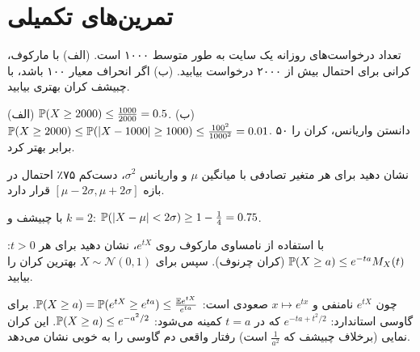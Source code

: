 \section{تمرین‌های تکمیلی}

\begin{exercise}
تعداد درخواست‌های روزانه یک سایت به طور متوسط ۱۰۰۰ است. (الف) با مارکوف، کرانی برای احتمال بیش از ۲۰۰۰ درخواست بیابید. (ب) اگر انحراف معیار ۱۰۰ باشد، با چبیشف کران بهتری بیابید.
\end{exercise}
\begin{solution}
(الف) $\mathbb{P}(X\ge2000)\le\frac{1000}{2000}=0.5$.
(ب) $\mathbb{P}(X\ge2000)\le\mathbb{P}(|X-1000|\ge1000)\le\frac{100^2}{1000^2}=0.01$. دانستن واریانس، کران را ۵۰ برابر بهتر کرد.
\end{solution}

\begin{exercise}
نشان دهید برای هر متغیر تصادفی با میانگین $\mu$ و واریانس $\sigma^2$، دست‌کم ۷۵٪ احتمال در بازه $[\mu-2\sigma,\mu+2\sigma]$ قرار دارد.
\end{exercise}
\begin{solution}
با چبیشف و $k=2$: $\mathbb{P}(|X-\mu|<2\sigma)\ge1-\frac14=0.75$.
\end{solution}

\begin{exercise}
با استفاده از نامساوی مارکوف روی $e^{tX}$، نشان دهید برای هر $t>0$: $\mathbb{P}(X\ge a)\le e^{-ta}M_X(t)$ (کران چرنوف). سپس برای $X\sim\mathcal N(0,1)$ بهترین کران را بیابید.
\end{exercise}
\begin{solution}
چون $e^{tX}$ نامنفی و $x\mapsto e^{tx}$ صعودی است: $\mathbb{P}(X\ge a)=\mathbb{P}(e^{tX}\ge e^{ta})\le\frac{\mathbb{E} e^{tX}}{e^{ta}}$.
برای گاوسی استاندارد: $e^{-ta+t^2/2}$ که در $t=a$ کمینه می‌شود: $\mathbb{P}(X\ge a)\le e^{-a^2/2}$. این کران نمایی (برخلاف چبیشف که $\frac{1}{a^2}$ است) رفتار واقعی دم گاوسی را به خوبی نشان می‌دهد.
\end{solution}
